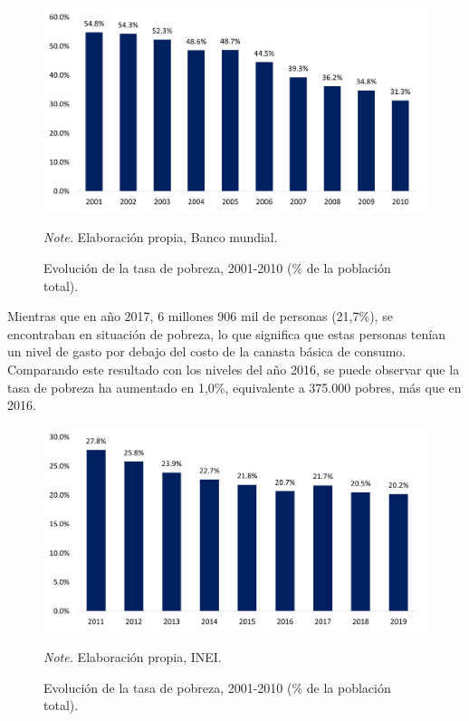 \begin{figure}[H]
    \caption{Evolución de la tasa de pobreza, 2001-2010 (\% de la población total).}
    \includegraphics[scale=0.8]{images/chapter1/Imagen2.jpg}
    \label{fig:Figure2}  
    
     \begin{tablenotes}
     {\small
         \textit{Note.} Elaboración propia, Banco mundial.
     }
     \end{tablenotes}
\end{figure}

Mientras que en año 2017, 6 millones 906 mil de personas (21,7\%), se encontraban en situación de pobreza, lo que significa que estas personas tenían un nivel de gasto por debajo del costo de la canasta básica de consumo. Comparando este resultado con los niveles del año 2016, se puede observar que la tasa de pobreza ha aumentado en 1,0\%, equivalente a 375.000 pobres, más que en 2016.

\begin{figure}[H]
    \caption{Evolución de la tasa de pobreza, 2001-2010 (\% de la población total).}
    \includegraphics[scale=0.8]{images/chapter1/Imagen3.jpg}
    \label{fig:Figure3}  
    
     \begin{tablenotes}
     {\small
         \textit{Note.} Elaboración propia, INEI.
     }
     \end{tablenotes}
\end{figure}

